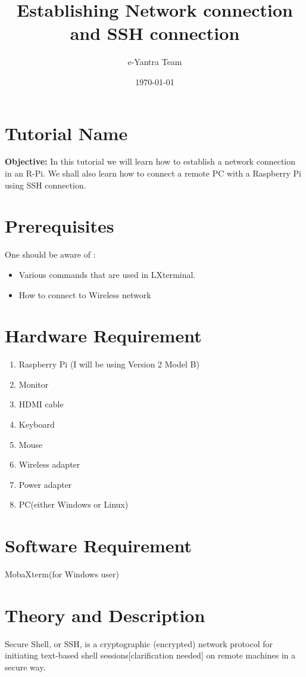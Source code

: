 \documentclass[11pt,a4paper]{article}
\title{Establishing Network connection and SSH connection}
\author{e-Yantra Team}
\date{\today}
\begin{document}
	\maketitle
	\newpage
	\tableofcontents
	\newpage
	\section{Tutorial Name}
	\textbf{Objective:} In this tutorial we will learn how to establish a network connection in an R-Pi. We shall also learn how to connect a remote PC with a Raspberry Pi using SSH connection.
	\section{Prerequisites}
	One should be aware of :
	\begin{itemize}
		\item Various commands that are used in LXterminal.
		\item How to connect to Wireless network
	\end{itemize}
	
	\section{Hardware Requirement}
	\begin{enumerate}
		\item Raspberry Pi (I will be using Version 2 Model B)
		\item Monitor
		\item HDMI cable
		\item Keyboard
		\item Mouse
		\item Wireless adapter
		\item Power adapter
		\item PC(either Windows or Linux)
	\end{enumerate}
		
	\section{Software Requirement}
	MobaXterm(for Windows user)
	
	\newpage
	\section{Theory and Description}
	Secure Shell, or SSH, is a cryptographic (encrypted) network protocol for initiating text-based shell sessions[clarification needed] on remote machines in a secure way.
	
\end{document}
